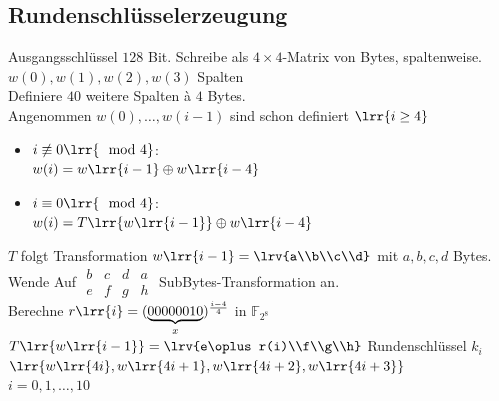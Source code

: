 	\subsection{Rundenschlüsselerzeugung}
		Ausgangsschlüssel $128$ Bit. Schreibe als $4\times 4$-Matrix von Bytes, spaltenweise.\\
		$w(0),w(1),w(2),w(3)$ Spalten \\
		Definiere $40$ weitere Spalten à $4$ Bytes.\\
		Angenommen $w(0),\dots,w(i-1)$ sind schon definiert $\lrr{i\geq 4}$
		\begin{itemize}
			\item $i\not\equiv 0\lrr{\mod 4}$:\\
				$w(i)=w\lrr{i-1}\oplus w\lrr{i-4}$
			\item $i\equiv 0\lrr{\mod 4}$:\\
				$w(i)=T\lrr{w\lrr{i-1}}\oplus w\lrr{i-4}$
		\end{itemize}
		$T$ folgt Transformation $w\lrr{i-1}=\lrv{a\\b\\c\\d}$ mit $a,b,c,d$ Bytes.\\
		Wende Auf $\begin{array}{cccc}b&c&d&a\\e&f&g&h\end{array}$ SubBytes-Transformation an.\\
		Berechne $r\lrr{i}=(\underbrace{00000010}_{x})^{\frac{i-4}{4}}$ in $\mathbb{F}_{2^8}$\\
		$T\lrr{w\lrr{i-1}}=\lrv{e\oplus r(i)\\f\\g\\h}$ Rundenschlüssel $k_i$\\
		$\lrr{w\lrr{4i},w\lrr{4i+1},w\lrr{4i+2},w\lrr{4i+3}}$\\
		$i=0,1,\dots,10$